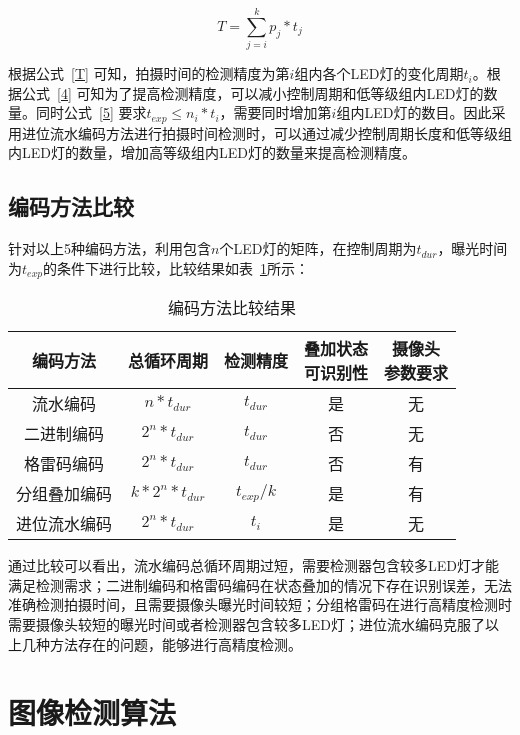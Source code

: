 \begin{equation}
T = \sum_{j=i}^k p_j * t_j
  \label{T}
\end{equation}

根据公式~\ref{T} 可知，拍摄时间的检测精度为第$i$组内各个LED灯的变化周期$t_i$。根据公式~\ref{4} 可知为了提高检测精度，可以减小控制周期和低等级组内LED灯的数量。同时公式~\ref{5} 要求$t_{exp} \le n_i * t_i$，需要同时增加第$i$组内LED灯的数目。因此采用进位流水编码方法进行拍摄时间检测时，可以通过减少控制周期长度和低等级组内LED灯的数量，增加高等级组内LED灯的数量来提高检测精度。

\subsection{编码方法比较}

针对以上5种编码方法，利用包含$n$个LED灯的矩阵，在控制周期为$t_{dur}$，曝光时间为$t_{exp}$的条件下进行比较，比较结果如表~\ref{comp}所示：

\begin{table}[h]
  \centering
  \caption{编码方法比较结果} 
  \label{comp}
  \begin{tabular}{c|c|c|c|c}\hline
  编码方法 & 总循环周期 & 检测精度 & \tabincell{c}{叠加状态\\可识别性}  & \tabincell{c}{摄像头\\参数要求} \\ \hline
  流水编码 & $n * t_{dur}$ & $t_{dur}$ & 是 & 无\\ \hline
  二进制编码 & $2^n * t_{dur}$ & $t_{dur}$ & 否 & 无 \\ \hline
  格雷码编码 & $2^n * t_{dur}$ & $t_{dur}$ & 否 & 有 \\ \hline
  分组叠加编码 & $k * 2 ^ n * t_{dur}$ & $t_{exp} / k$ & 是 & 有 \\ \hline
  进位流水编码 & $2^n * t_{dur}$ & $t_i$ & 是 & 无 \\ \hline
  \end{tabular}
\end{table}

通过比较可以看出，流水编码总循环周期过短，需要检测器包含较多LED灯才能满足检测需求；二进制编码和格雷码编码在状态叠加的情况下存在识别误差，无法准确检测拍摄时间，且需要摄像头曝光时间较短；分组格雷码在进行高精度检测时需要摄像头较短的曝光时间或者检测器包含较多LED灯；进位流水编码克服了以上几种方法存在的问题，能够进行高精度检测。

\section{图像检测算法}
\label{detecSe}

